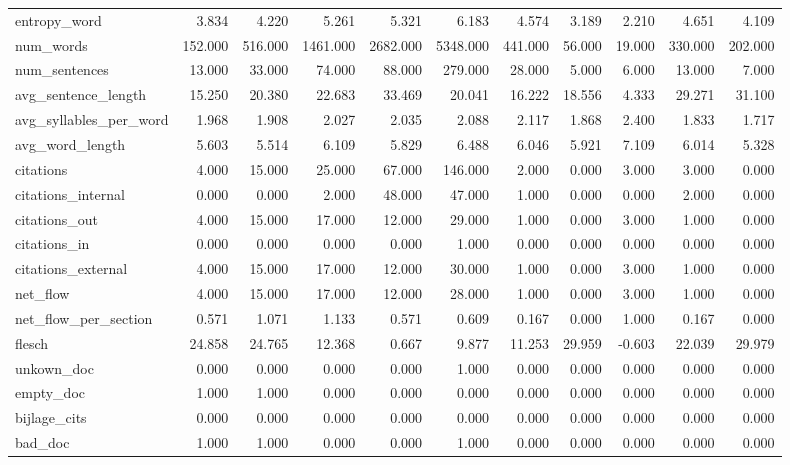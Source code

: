 \begin{tabular}{lrrrrrrrrrr}
\cline{1-11}
entropy\_word & 3.834 & 4.220 & 5.261 & 5.321 & 6.183 & 4.574 & 3.189 & 2.210 & 4.651 & 4.109 \\
\cline{1-11}
num\_words & 152.000 & 516.000 & 1461.000 & 2682.000 & 5348.000 & 441.000 & 56.000 & 19.000 & 330.000 & 202.000 \\
\cline{1-11}
num\_sentences & 13.000 & 33.000 & 74.000 & 88.000 & 279.000 & 28.000 & 5.000 & 6.000 & 13.000 & 7.000 \\
\cline{1-11}
avg\_sentence\_length & 15.250 & 20.380 & 22.683 & 33.469 & 20.041 & 16.222 & 18.556 & 4.333 & 29.271 & 31.100 \\
\cline{1-11}
avg\_syllables\_per\_word & 1.968 & 1.908 & 2.027 & 2.035 & 2.088 & 2.117 & 1.868 & 2.400 & 1.833 & 1.717 \\
\cline{1-11}
avg\_word\_length & 5.603 & 5.514 & 6.109 & 5.829 & 6.488 & 6.046 & 5.921 & 7.109 & 6.014 & 5.328 \\
\cline{1-11}
citations & 4.000 & 15.000 & 25.000 & 67.000 & 146.000 & 2.000 & 0.000 & 3.000 & 3.000 & 0.000 \\
\cline{1-11}
citations\_internal & 0.000 & 0.000 & 2.000 & 48.000 & 47.000 & 1.000 & 0.000 & 0.000 & 2.000 & 0.000 \\
\cline{1-11}
citations\_out & 4.000 & 15.000 & 17.000 & 12.000 & 29.000 & 1.000 & 0.000 & 3.000 & 1.000 & 0.000 \\
\cline{1-11}
citations\_in & 0.000 & 0.000 & 0.000 & 0.000 & 1.000 & 0.000 & 0.000 & 0.000 & 0.000 & 0.000 \\
\cline{1-11}
citations\_external & 4.000 & 15.000 & 17.000 & 12.000 & 30.000 & 1.000 & 0.000 & 3.000 & 1.000 & 0.000 \\
\cline{1-11}
net\_flow & 4.000 & 15.000 & 17.000 & 12.000 & 28.000 & 1.000 & 0.000 & 3.000 & 1.000 & 0.000 \\
\cline{1-11}
net\_flow\_per\_section & 0.571 & 1.071 & 1.133 & 0.571 & 0.609 & 0.167 & 0.000 & 1.000 & 0.167 & 0.000 \\
\cline{1-11}
flesch & 24.858 & 24.765 & 12.368 & 0.667 & 9.877 & 11.253 & 29.959 & -0.603 & 22.039 & 29.979 \\
\cline{1-11}
unkown\_doc & 0.000 & 0.000 & 0.000 & 0.000 & 1.000 & 0.000 & 0.000 & 0.000 & 0.000 & 0.000 \\
\cline{1-11}
empty\_doc & 1.000 & 1.000 & 0.000 & 0.000 & 0.000 & 0.000 & 0.000 & 0.000 & 0.000 & 0.000 \\
\cline{1-11}
bijlage\_cits & 0.000 & 0.000 & 0.000 & 0.000 & 0.000 & 0.000 & 0.000 & 0.000 & 0.000 & 0.000 \\
\cline{1-11}
bad\_doc & 1.000 & 1.000 & 0.000 & 0.000 & 1.000 & 0.000 & 0.000 & 0.000 & 0.000 & 0.000 \\
\cline{1-11}
\bottomrule
\end{tabular}
